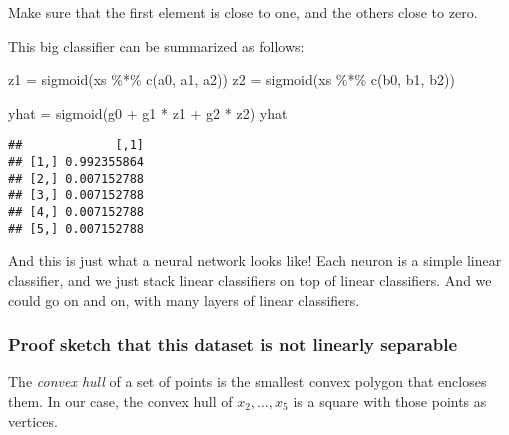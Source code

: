 \documentclass[
]{article}
\newenvironment{Shaded}{\begin{snugshade}}{\end{snugshade}}
\newcommand{\FunctionTok}[1]{\textcolor[rgb]{0.00,0.00,0.00}{#1}}
\newcommand{\NormalTok}[1]{#1}
\newcommand{\OtherTok}[1]{\textcolor[rgb]{0.56,0.35,0.01}{#1}}
\newcommand{\SpecialCharTok}[1]{\textcolor[rgb]{0.00,0.00,0.00}{#1}}
\begin{document}
Make sure that the first element is close to one, and the others close
to zero.

This big classifier can be summarized as follows:

\begin{Shaded}
\begin{Highlighting}[]
\NormalTok{z1 }\OtherTok{=} \FunctionTok{sigmoid}\NormalTok{(xs }\SpecialCharTok{\%*\%} \FunctionTok{c}\NormalTok{(a0, a1, a2))}
\NormalTok{z2 }\OtherTok{=} \FunctionTok{sigmoid}\NormalTok{(xs }\SpecialCharTok{\%*\%} \FunctionTok{c}\NormalTok{(b0, b1, b2))}

\NormalTok{yhat }\OtherTok{=} \FunctionTok{sigmoid}\NormalTok{(g0 }\SpecialCharTok{+}\NormalTok{ g1 }\SpecialCharTok{*}\NormalTok{ z1 }\SpecialCharTok{+}\NormalTok{ g2 }\SpecialCharTok{*}\NormalTok{ z2)}
\NormalTok{yhat}
\end{Highlighting}
\end{Shaded}

\begin{verbatim}
##             [,1]
## [1,] 0.992355864
## [2,] 0.007152788
## [3,] 0.007152788
## [4,] 0.007152788
## [5,] 0.007152788
\end{verbatim}

And this is just what a neural network looks like! Each neuron is a
simple linear classifier, and we just stack linear classifiers on top of
linear classifiers. And we could go on and on, with many layers of
linear classifiers.

\hypertarget{proof-sketch-that-this-dataset-is-not-linearly-separable}{%
\subsubsection{Proof sketch that this dataset is not linearly
separable}\label{proof-sketch-that-this-dataset-is-not-linearly-separable}}

The \emph{convex hull} of a set of points is the smallest convex polygon
that encloses them. In our case, the convex hull of \(x_2,\ldots,x_5\)
is a square with those points as vertices.
\end{document}
